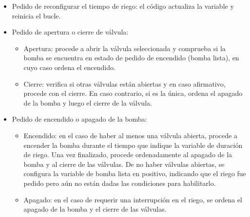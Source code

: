 \begin{itemize}
\item Pedido de reconfigurar el tiempo de riego: el código actualiza la variable y reinicia el bucle.

\item Pedido de apertura o cierre de válvula:
    \begin{itemize}
    \item Apertura: procede a abrir la válvula seleccionada y  comprueba si la bomba se encuentra en estado de pedido de encendido (bomba lista), en cuyo caso ordena el encendido.
    \item Cierre: verifica si otras válvulas están abiertas y en caso afirmativo, procede con el cierre. En caso contrario, si es la única, ordena el apagado de la bomba y luego el cierre de la válvula.
    
    \end{itemize}

\item Pedido de encendido o apagado de la bomba:
    \begin{itemize}
    \item Encendido: en el caso de haber al menos una válvula abierta, procede a encender la bomba durante el tiempo que indique la variable de duración de riego. Una vez finalizado, procede ordenadamente al apagado de la bomba y al cierre de las válvulas. De no haber válvulas abiertas, se configura la variable de bomba lista en positivo, indicando que el riego fue pedido pero aún no están dadas las condiciones para habilitarlo.
    \item Apagado: en el caso de requerir una interrupción en el riego, se ordena el apagado de la bomba y el cierre de las válvulas.
    
    \end{itemize}



\end{itemize}


